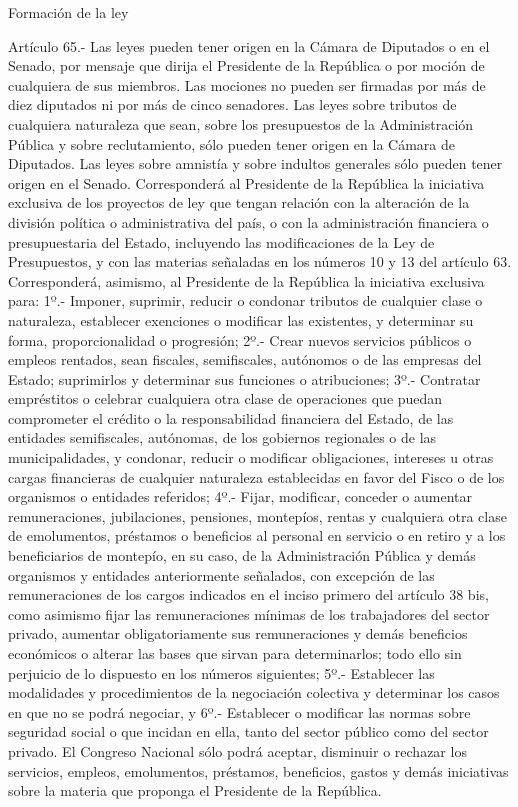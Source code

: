     Formación de la ley



    Artículo 65.- Las leyes pueden tener origen en la Cámara de Diputados o en el Senado, por mensaje que dirija el Presidente de la República o por moción de cualquiera de sus miembros. Las mociones no pueden ser firmadas por más de diez diputados ni por más de cinco senadores.
    Las leyes sobre tributos de cualquiera naturaleza que sean, sobre los presupuestos de la Administración Pública y sobre reclutamiento, sólo pueden tener origen en la Cámara de Diputados. Las leyes sobre amnistía y sobre indultos generales sólo pueden tener origen en el Senado.
    Corresponderá al Presidente de la República la iniciativa exclusiva de los proyectos de ley que tengan relación con la alteración de la división política o administrativa del país, o con la administración financiera o presupuestaria del Estado, incluyendo las modificaciones de la Ley de Presupuestos, y con las materias señaladas en los números 10 y 13 del artículo 63.
    Corresponderá, asimismo, al Presidente de la República la iniciativa exclusiva para:
    1º.- Imponer, suprimir, reducir o condonar tributos de cualquier clase o naturaleza, establecer exenciones o modificar las existentes, y determinar su forma, proporcionalidad o progresión;
    2º.- Crear nuevos servicios públicos o empleos rentados, sean fiscales, semifiscales, autónomos o de las empresas del Estado; suprimirlos y determinar sus funciones o atribuciones;
    3º.- Contratar empréstitos o celebrar cualquiera otra clase de operaciones que puedan comprometer el crédito o la responsabilidad financiera del Estado, de las entidades semifiscales, autónomas, de los gobiernos regionales o de las municipalidades, y condonar, reducir o modificar obligaciones, intereses u otras cargas financieras de cualquier naturaleza establecidas en favor del Fisco o de los organismos o entidades referidos;
    4º.- Fijar, modificar, conceder o aumentar remuneraciones, jubilaciones, pensiones, montepíos, rentas y cualquiera otra clase de emolumentos, préstamos o beneficios al personal en servicio o en retiro y a los beneficiarios de montepío, en su caso, de la Administración Pública y demás organismos y entidades anteriormente señalados, con excepción de las remuneraciones de los cargos indicados en el inciso primero del artículo 38 bis, como asimismo fijar las remuneraciones mínimas de los trabajadores del sector privado, aumentar obligatoriamente sus remuneraciones y demás beneficios económicos o alterar las bases que sirvan para determinarlos; todo ello sin perjuicio de lo dispuesto en los números siguientes;
    5º.- Establecer las modalidades y procedimientos de la negociación colectiva y determinar los casos en que no se podrá negociar, y
    6º.- Establecer o modificar las normas sobre seguridad social o que incidan en ella, tanto del sector público como del sector privado.
    El Congreso Nacional sólo podrá aceptar, disminuir o rechazar los servicios, empleos, emolumentos, préstamos, beneficios, gastos y demás iniciativas sobre la materia que proponga el Presidente de la República.




